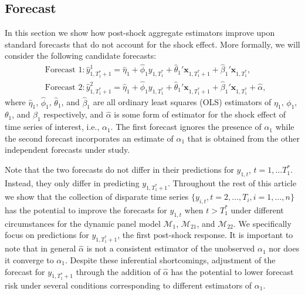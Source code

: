\documentclass[11pt]{article}
\newcommand{\x}{\textbf{x}}
\def\mc#1{\mathcal{#1}} %
\def\E#1{\mathrm{E}(#1)} %
\theoremstyle{definition}
\begin{document}
\subsection{Forecast}
\label{forecast}
In this section we show how post-shock aggregate estimators improve upon standard 
forecasts that do not account for the shock effect.
More formally, we will consider the following candidate forecasts: 
\begin{align*}
  &\text{Forecast 1}: \hat y_{1,T_1^*+1}^1 = \hat\eta_1 
    + \hat\phi_1 y_{1,T_1^*} + \hat\theta_1'\x_{1,T_1^*+1} 
    + \hat\beta_1'\x_{1,T_1^*}, \\
  &\text{Forecast 2}: \hat y_{1,T_1^*+1}^2 = \hat\eta_1 
    + \hat\phi_1 y_{1,T_1^*} + \hat\theta_1'\x_{1,T_1^*+1} 
    + \hat\beta_1'\x_{1,T_1^*} + \hat{\alpha},
\end{align*}
where $\hat\eta_1$, $\hat\phi_1$, $\hat\theta_1$, and $\hat\beta_1$ are all ordinary least squares (OLS) estimators of $\eta_1$, $\phi_1$, $\theta_1$, and $\beta_1$ respectively, and $\hat{\alpha}$ is some form of estimator for the shock effect of time series of interest, i.e., $\alpha_1$. 
The first forecast ignores the presence of $\alpha_1$ while the second forecast 
incorporates an estimate of $\alpha_1$ that is obtained from the other independent forecasts under study. 

Note that the two forecasts do not differ in their predictions for 
$y_{1,t}$, $t = 1,\ldots T_1^*$. Instead, they only differ in predicting 
$y_{1,T_1^*+1}$. Throughout the rest of this article we show that the collection of 
disparate time series $\{y_{i,t}, t = 2,\ldots,T_i, i = 1,\ldots,n\}$ has 
the potential to improve the forecasts for $y_{1, t}$ when $t > T_1^*$ under different 
circumstances for the dynamic panel model $\mc{M}_1$, $\mc{M}_{21}$, and $\mc{M}_{22}$. We specifically focus on predictions for $y_{1,T_1^*+1}$, the first post-shock response. It is important to note that in general $\hat{\alpha}$ 
is not a consistent estimator of the unobserved $\alpha_1$ nor does it converge 
to $\alpha_1$.  Despite these inferential shortcomings, adjustment of the forecast 
for $y_{1,T_1^*+1}$ through the addition of $\hat{\alpha}$ has 
the potential to lower forecast risk under several conditions corresponding to 
different estimators of $\alpha_1$. %
\end{document}
